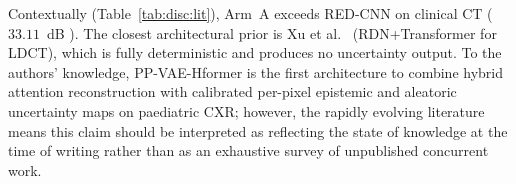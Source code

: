 \documentclass[12pt, a4paper, twoside, openright]{book}
\begin{document}
Contextually (Table~\ref{tab:disc:lit}), Arm~A exceeds RED-CNN on clinical CT ($33.11$~dB \cite{chen_low_2017}). The closest architectural prior is Xu et al.\ \cite{xuLowdoseComputedTomography2025} (RDN+Transformer for LDCT), which is fully deterministic and produces no uncertainty output. To the authors' knowledge, PP-VAE-Hformer is the first architecture to combine hybrid attention reconstruction with calibrated per-pixel epistemic and aleatoric uncertainty maps on paediatric CXR; however, the rapidly evolving literature means this claim should be interpreted as reflecting the state of knowledge at the time of writing rather than as an exhaustive survey of unpublished concurrent work.

\begin{landscape}
\singlespacing
\small
\setlength{\LTcapwidth}{\linewidth}
\begin{longtable}{llccl}


\end{longtable}
\end{landscape}
\end{document}
